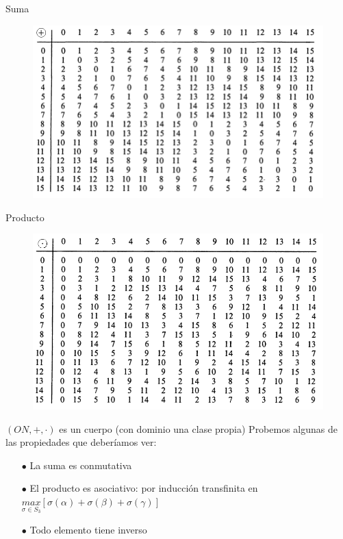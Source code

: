 \documentclass[10pt,spanish]{beamer}
\begin{document}
\begin{frame}{Suma}	
	\begin{figure}
	\includegraphics[scale=0.5,left]{nim_addition.png}
	\end{figure}
\end{frame}

\begin{frame}{Producto}
	\begin{figure}
	\includegraphics[scale=0.5,left]{nim_product.png}
	\end{figure}
\end{frame}

\begin{frame}{$(ON,+,\cdot)$ es un cuerpo (con dominio una clase propia)}
	Probemos algunas de las propiedades que deberíamos ver:
	
	\begin{itemize}
		\item[$\bullet$]La suma es conmutativa
		\item[$\bullet$]El producto es asociativo: por inducción transfinita en $\underset{\sigma \in S_3}{max}[\sigma(\alpha) + \sigma(\beta) + \sigma(\gamma)]$
		\item[$\bullet$]Todo elemento tiene inverso
	\end{itemize}
\end{frame}
\end{document}
